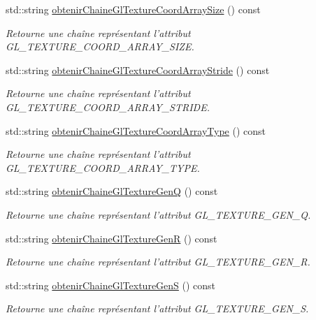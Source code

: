 \begin{DoxyCompactItemize}
std\-::string \hyperlink{group__utilitaire_ga874c08bb1dab5bf56279fa496f347017}{obtenir\-Chaine\-Gl\-Texture\-Coord\-Array\-Size} () const 
\begin{DoxyCompactList}\small\item\em Retourne une chaîne représentant l'attribut G\-L\-\_\-\-T\-E\-X\-T\-U\-R\-E\-\_\-\-C\-O\-O\-R\-D\-\_\-\-A\-R\-R\-A\-Y\-\_\-\-S\-I\-Z\-E. \end{DoxyCompactList}\item 
std\-::string \hyperlink{group__utilitaire_ga0cef5f78ea9815fc83b519aff2694d5b}{obtenir\-Chaine\-Gl\-Texture\-Coord\-Array\-Stride} () const 
\begin{DoxyCompactList}\small\item\em Retourne une chaîne représentant l'attribut G\-L\-\_\-\-T\-E\-X\-T\-U\-R\-E\-\_\-\-C\-O\-O\-R\-D\-\_\-\-A\-R\-R\-A\-Y\-\_\-\-S\-T\-R\-I\-D\-E. \end{DoxyCompactList}\item 
std\-::string \hyperlink{group__utilitaire_ga6cae6d3addddcf37939f5543fffab86f}{obtenir\-Chaine\-Gl\-Texture\-Coord\-Array\-Type} () const 
\begin{DoxyCompactList}\small\item\em Retourne une chaîne représentant l'attribut G\-L\-\_\-\-T\-E\-X\-T\-U\-R\-E\-\_\-\-C\-O\-O\-R\-D\-\_\-\-A\-R\-R\-A\-Y\-\_\-\-T\-Y\-P\-E. \end{DoxyCompactList}\item 
std\-::string \hyperlink{group__utilitaire_ga2bc696d575361d0668e25ab8f8455c21}{obtenir\-Chaine\-Gl\-Texture\-Gen\-Q} () const 
\begin{DoxyCompactList}\small\item\em Retourne une chaîne représentant l'attribut G\-L\-\_\-\-T\-E\-X\-T\-U\-R\-E\-\_\-\-G\-E\-N\-\_\-\-Q. \end{DoxyCompactList}\item 
std\-::string \hyperlink{group__utilitaire_ga232ca6071605477892ccd38781f48b53}{obtenir\-Chaine\-Gl\-Texture\-Gen\-R} () const 
\begin{DoxyCompactList}\small\item\em Retourne une chaîne représentant l'attribut G\-L\-\_\-\-T\-E\-X\-T\-U\-R\-E\-\_\-\-G\-E\-N\-\_\-\-R. \end{DoxyCompactList}\item 
std\-::string \hyperlink{group__utilitaire_gac92ef30b356fe2de552d88b455aa0b20}{obtenir\-Chaine\-Gl\-Texture\-Gen\-S} () const 
\begin{DoxyCompactList}\small\item\em Retourne une chaîne représentant l'attribut G\-L\-\_\-\-T\-E\-X\-T\-U\-R\-E\-\_\-\-G\-E\-N\-\_\-\-S. \end{DoxyCompactList}\item 

\end{DoxyCompactItemize}
